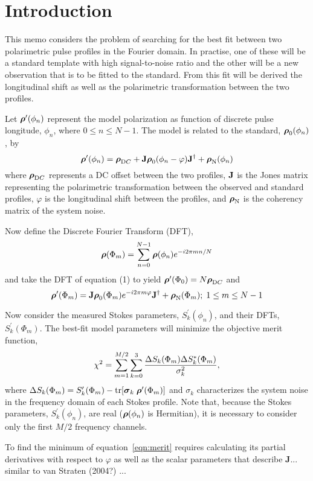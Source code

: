 \documentclass[12pt]{article}
\newcommand{\mbf}[1]{\mbox{\boldmath $#1$}}
\newcommand{\trace}{{\rm tr}}
\newcommand{\pauli}[1]{\ensuremath{ {\mbf{\sigma}}_{#1} }}
\begin{document}
\section{Introduction}

This memo considers the problem of searching for the best fit between
two polarimetric pulse profiles in the Fourier domain.  In practise,
one of these will be a standard template with high signal-to-noise
ratio and the other will be a new observation that is to be fitted to
the standard.  From this fit will be derived the longitudinal shift as
well as the polarimetric transformation between the two profiles.

Let $\mbf{\rho}^\prime (\phi_n)$ represent the model polarization as
function of discrete pulse longitude, $\phi_n$, where $0\le n\le N-1$.
The model is related to the standard, $\mbf{\rho}_0(\phi_n)$, by
\begin{equation}
\mbf{\rho}^\prime (\phi_n) = \mbf{\rho}_{\mathrm DC} + {\bf J} \mbf{\rho}_0
  (\phi_n - \varphi) {\bf J}^\dagger + \mbf{\rho}_{\mathrm N}(\phi_n)
\end{equation}
where $\mbf{\rho}_{\mathrm DC}$ represents a DC offset between the two
profiles, ${\bf J}$ is the Jones matrix representing the polarimetric
transformation between the observed and standard profiles, $\varphi$
is the longitudinal shift between the profiles, and
$\mbf{\rho}_{\mathrm N}$ is the coherency matrix of the system noise.

Now define the Discrete Fourier Transform (DFT),
\begin{equation}
\mbf{\rho}(\Phi_m) = \sum_{n=0}^{N-1} \mbf{\rho}(\phi_n) e^{-i2\pi mn/N}
\end{equation}
and take the DFT of equation (1) to yield
$\mbf{\rho}^\prime (\Phi_0) =  N\mbf{\rho}_{\mathrm DC}$ and
\begin{equation}
\mbf{\rho}^\prime (\Phi_m) =  {\bf J}
  \mbf{\rho}_0 (\Phi_m) e^{-i2\pi m \varphi} {\bf J}^\dagger +
  \mbf{\rho}_{\mathrm N}(\Phi_m); \; 1\le m\le N-1
\label{eqn:fourier_rho}
\end{equation}


Now consider the measured Stokes parameters, $S_k^\prime(\phi_n)$, and
their DFTs, $S_k^\prime(\Phi_m)$.  The best-fit model parameters will
minimize the objective merit function,
\begin{equation}
\chi^2 = \sum_{m=1}^{M/2} \sum_{k=0}^3 
	{ \Delta S_k(\Phi_m)\Delta S_k^*(\Phi_m) \over \sigma_k^2 },
\label{eqn:merit}
\end{equation}
where $\Delta S_k(\Phi_m) = S_k^\prime(\Phi_m) -
\trace[\pauli{k}\;\mbf{\rho}^\prime(\Phi_m)]$ and $\sigma_k$
characterizes the system noise in the frequency domain of each Stokes
profile. Note that, because the Stokes parameters,
$S_k^\prime(\phi_n)$, are real ($\mbf{\rho}(\phi_n)$ is Hermitian), it
is necessary to consider only the first $M/2$ frequency channels.

To find the minimum of equation~\ref{eqn:merit} requires calculating
its partial derivatives with respect to $\varphi$ as well as the
scalar parameters that describe {\bf J}...  similar to van Straten
(2004?) ...
\end{document}
